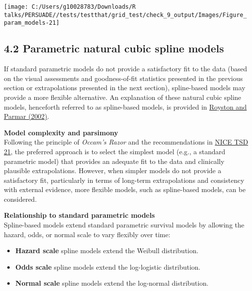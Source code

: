 \documentclass[
]{article}
\providecommand{\tightlist}{%
  \setlength{\itemsep}{0pt}\setlength{\parskip}{0pt}}
\begin{document}
\begin{flushleft}\texttt{[image: C:/Users/g10028783/Downloads/R talks/PERSUADE//tests/testthat/grid\_test/check\_9\_output/Images/Figure\_param\_models-21]} \end{flushleft}

\clearpage

\subsection{4.2 Parametric natural cubic spline
models}\label{parametric-natural-cubic-spline-models}

If standard parametric models do not provide a satisfactory fit to the
data (based on the visual assessments and goodness-of-fit statistics
presented in the previous section or extrapolations presented in the
next section), spline-based models may provide a more flexible
alternative. An explanation of these natural cubic spline models,
henceforth referred to as spline-based models, is provided in
\href{https://doi.org/10.1002/sim.1203}{Royston and Parmar (2002)}.

\textbf{Model complexity and parsimony}\\
Following the principle of \emph{Occam's Razor} and the recommendations
in
\href{https://www.sheffield.ac.uk/media/34188/download?attachment}{NICE
TSD 21}, the preferred approach is to select the simplest model (e.g., a
standard parametric model) that provides an adequate fit to the data and
clinically plausible extrapolations. However, when simpler models do not
provide a satisfactory fit, particularly in terms of long-term
extrapolations and consistency with external evidence, more flexible
models, such as spline-based models, can be considered.

\textbf{Relationship to standard parametric models}\\
Spline-based models extend standard parametric survival models by
allowing the hazard, odds, or normal scale to vary flexibly over time:

\begin{itemize}
\tightlist
\item
  \textbf{Hazard scale} spline models extend the Weibull distribution.\\
\item
  \textbf{Odds scale} spline models extend the log-logistic
  distribution.\\
\item
  \textbf{Normal scale} spline models extend the log-normal
  distribution.
\end{itemize}
\end{document}
